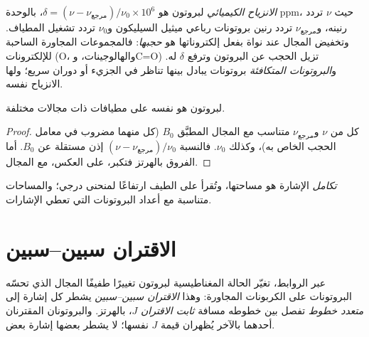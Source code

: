 \begin{definition}\label{def:b1:structure-spectroscopy:chemical-shift}
\emph{الانزياح الكيميائي} لبروتون هو
$\delta = (\nu - \nu_{\text{مرجع}})/\nu_0 \times 10^6$، بالوحدة \unit{ppm}، حيث
$\nu$ تردد رنينه، و$\nu_{\text{مرجع}}$ تردد رنين بروتونات
رباعي ميثيل السيليكون و$\nu_0$ تردد تشغيل
المطياف. وتخفيض المجال عند نواة بفعل إلكتروناتها هو
\emph{حجبها}: فالمجموعات المجاورة الساحبة للإلكترونات
(O، والهالوجينات، وC=O) تزيل الحجب عن البروتون وترفع $\delta$ له.
و\emph{البروتونات المتكافئة} بروتونات يبادل بينها
تناظر في الجزيء أو دوران سريع؛ ولها
الانزياح نفسه.
\end{definition}

\begin{proposition}\label{prop:b1:structure-spectroscopy:shift-field-independent}
 لبروتون هو نفسه على مطيافات ذات
مجالات مختلفة.
\end{proposition}

\begin{proof}
كل من $\nu$ و$\nu_{\text{مرجع}}$ متناسب مع المجال المطبَّق
$B_0$ (كل منهما مضروب في معامل الحجب الخاص به)، وكذلك $\nu_0$.
فالنسبة $(\nu - \nu_{\text{مرجع}})/\nu_0$ إذن مستقلة عن
$B_0$. أما الفروق بالهرتز فتكبر، على العكس، مع المجال.
\end{proof}

\begin{definition}[التكامل]\label{def:b1:structure-spectroscopy:integration}
\emph{تكامل} الإشارة هو مساحتها، وتُقرأ
على الطيف ارتفاعًا لمنحنى درجي؛ والمساحات متناسبة مع
أعداد البروتونات التي تعطي الإشارات.
\end{definition}

\section{الاقتران سبين--سبين}

\begin{definition}\label{def:b1:structure-spectroscopy:coupling}
عبر الروابط، تغيّر الحالة المغناطيسية لبروتون تغييرًا طفيفًا
المجال الذي تحسّه البروتونات على الكربونات المجاورة: وهذا
\emph{الاقتران سبين--سبين} يشطر كل إشارة
إلى \emph{متعدد خطوط} تفصل بين خطوطه مسافة
\emph{ثابت الاقتران} $J$، بالهرتز. والبروتونان
المقترنان أحدهما بالآخر يُظهران قيمة $J$ نفسها؛ 
لا يشطر بعضها إشارة بعض.
\end{definition}

